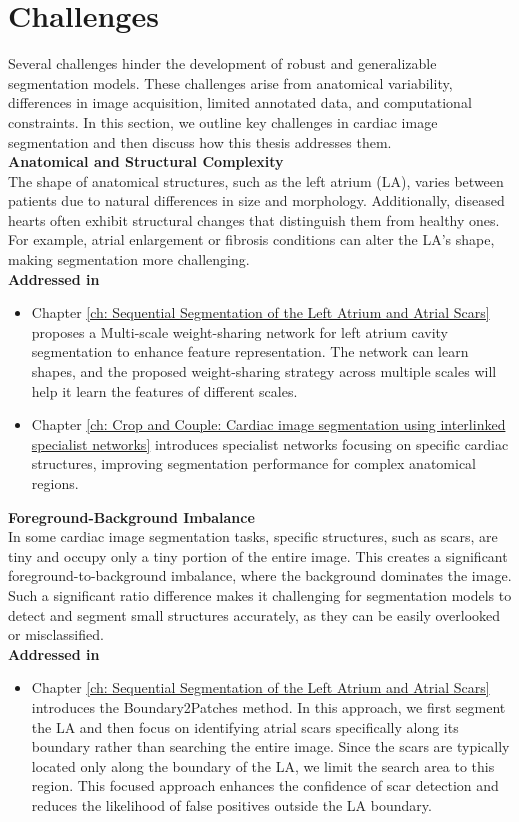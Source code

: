 \section{Challenges}
Several challenges hinder the development of robust and generalizable segmentation models. These challenges arise from anatomical variability, differences in image acquisition, limited annotated data, and computational constraints. In this section, we outline key challenges in cardiac image segmentation and then discuss how this thesis addresses them.\\
\noindent\textbf{Anatomical and Structural Complexity}\\
The shape of anatomical structures, such as the left atrium (LA), varies between patients due to natural differences in size and morphology. Additionally, diseased hearts often exhibit structural changes that distinguish them from healthy ones. For example, atrial enlargement or fibrosis conditions can alter the LA’s shape, making segmentation more challenging.\\
\textbf{Addressed in}
\begin{itemize}
    \item Chapter \ref{ch: Sequential Segmentation of the Left Atrium and Atrial Scars} proposes a Multi-scale weight-sharing network for left atrium cavity segmentation to enhance feature representation. The network can learn shapes, and the proposed weight-sharing strategy across multiple scales will help it learn the features of different scales.
    \item Chapter \ref{ch: Crop and Couple: Cardiac image segmentation using interlinked specialist networks} introduces specialist networks focusing on specific cardiac structures, improving segmentation performance for complex anatomical regions.
\end{itemize} 
\noindent\textbf{Foreground-Background Imbalance}\\
In some cardiac image segmentation tasks, specific structures, such as scars, are tiny and occupy only a tiny portion of the entire image. This creates a significant foreground-to-background imbalance, where the background dominates the image. Such a significant ratio difference makes it challenging for segmentation models to detect and segment small structures accurately, as they can be easily overlooked or misclassified.\\
\textbf{Addressed in}
\begin{itemize}
    \item Chapter \ref{ch: Sequential Segmentation of the Left Atrium and Atrial Scars} introduces the Boundary2Patches method. In this approach, we first segment the LA and then focus on identifying atrial scars specifically along its boundary rather than searching the entire image. Since the scars are typically located only along the boundary of the LA, we limit the search area to this region. This focused approach enhances the confidence of scar detection and reduces the likelihood of false positives outside the LA boundary.
\end{itemize}

